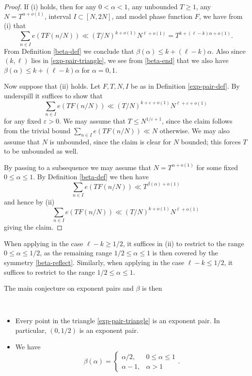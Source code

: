 \documentclass[a4paper, 10pt]{amsart}
\newcommand{\eps}{\varepsilon}
\begin{document}
\begin{proof}  If (i) holds, then for any $0 < \alpha < 1$, any unbounded $T \geq 1$, any $N = T^{\alpha+o(1)}$, interval $I \subset [N,2N]$, and model phase function $F$, we have from (i) that
$$ \sum_{n \in I} e(T F(n/N)) \ll (T/N)^{k+o(1)} N^{\ell+o(1)} = T^{k + (\ell-k)\alpha + o(1)}.$$
From Definition \ref{beta-def} we conclude that $\beta(\alpha) \leq k + (\ell-k) \alpha$.  Also since $(k,\ell)$ lies in \eqref{exp-pair-triangle}, we see from \eqref{beta-end} that we also have $\beta(\alpha) \leq k + (\ell-k) \alpha$ for $\alpha=0,1$.

Now suppose that (ii) holds.  Let $F, T, N, I$ be as in Definition \ref{exp-pair-def}.  By underspill it suffices to show that
$$ \sum_{n \in I} e(T F(n/N)) \ll (T/N)^{k+\eps+o(1)} N^{\ell+\eps+o(1)}$$
for any fixed $\eps>0$.  We may assume that $T \leq N^{1/\eps+1}$, since the claim follows from the trivial bound $\sum_{n \in I} e(T F(n/N)) \ll N$ otherwise.  We may also assume that $N$ is unbounded, since the claim is clear for $N$ bounded; this forces $T$ to be unbounded as well.

By passing to a subsequence we may assume that $N = T^{\alpha+o(1)}$ for some fixed $0 \leq \alpha \leq 1$.  By Definition \ref{beta-def} we then have
$$ \sum_{n \in I} e(T F(n/N)) \ll T^{\beta(\alpha)+o(1)}$$
and hence by (ii)
$$ \sum_{n \in I} e(T F(n/N)) \ll (T/N)^{k+o(1)} N^{\ell+o(1)}$$
giving the claim.
\end{proof}

\begin{remark}  When applying  in the case $\ell-k \geq 1/2$, it suffices in (ii) to restrict to the range $0 \leq \alpha \leq 1/2$, as the remaining range $1/2 \leq \alpha \leq 1$ is then covered by the symmetry \eqref{beta-reflect}.  Similarly, when applying  in the case $\ell-k \leq 1/2$, it suffices to restrict to the range $1/2 \leq \alpha \leq 1$.
\end{remark}

The main conjecture on exponent pairs and $\beta$ is then

\begin{conjecture}\label{exp-pair-conj}\
    \begin{itemize}
    \item[(i)] Every point in the triangle \eqref{exp-pair-triangle} is an exponent pair.  In particular, $(0,1/2)$ is an exponent pair.
    \item[(ii)]  We have
\[
\beta(\alpha) = \begin{cases}
\alpha/2,& 0 \leq \alpha \leq 1\\
\alpha - 1,&\alpha > 1
\end{cases}.
\]
    \end{itemize}
\end{conjecture}
\end{document}
